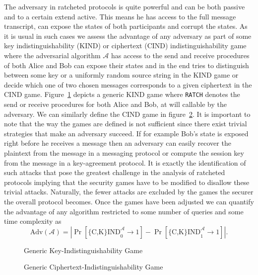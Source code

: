 \documentclass[11pt,a4paper,twoside,openright,bibliography=totoc]{scrbook}
\renewcommand{\t}{\text} %
\begin{document}
The adversary in ratcheted protocols is quite powerful and can be both
passive and to a certain extend active. This means he has access to
the full message transcript, can expose the states of both
participants and corrupt the states. As it is
usual in such cases we assess the advantage of any adversary as part
of some key indistinguishability (KIND) or ciphertext (CIND)
indistinguishability game where the adversarial algorithm $\mathcal{A}$
has access to the send and receive procedures of both Alice and Bob can expose their states
and in the end tries to distinguish between some key or a uniformly
random source string in the KIND
game or decide which one of two chosen messages corresponds to a given
ciphertext in the CIND game.
Figure~\ref{fig:kind} depicts a generic KIND game where \texttt{RATCH} denotes
the send or receive procedures for both Alice and Bob, at will callable by the
adversary. We can similarly define the CIND game in figure~\ref{fig:cind}.
It is important to note that the way the games are defined is
not sufficient since there exist trivial strategies that make an adversary
succeed. If for example Bob's state is exposed right before he
receives a message then an adversary can easily recover the plaintext
from the message in a messaging protocol or compute the session key
from the message in a key-agreement protocol. It is exactly the
identification of such attacks that pose the greatest
challenge in the analysis of ratcheted protocols implying that the security games
have to be modified to disallow these trivial attacks. Naturally,
the fewer attacks are excluded by the games the securer the overall
protocol becomes. Once the games have been adjusted we can
quantify the advantage of any algorithm restricted to some number of queries
and some time complexity as
\[
  \t{Adv}(\mathcal{A}) = \left| \Pr \left[ \t{\{C,K\}IND}_0^\mathcal{A} \rightarrow 1 \right] -
                                \Pr \left[ \t{\{C,K\}IND}_1^\mathcal{A} \rightarrow 1 \right]
                         \right|.
\]

\begin{figure}[ht]
  \centering
  \setlength{\fboxsep}{10pt}
  \scalebox{0.9}{%
    \fbox{%
      
    }
  }
  \caption{Generic Key-Indistinguishability Game}
  \label{fig:kind}
\end{figure}

\begin{figure}[ht]
  \centering
  \setlength{\fboxsep}{10pt}
  \scalebox{0.9}{%
    \fbox{%
      
    }
  }
  \caption{Generic Ciphertext-Indistinguishability Game}
  \label{fig:cind}
\end{figure}
\end{document}
